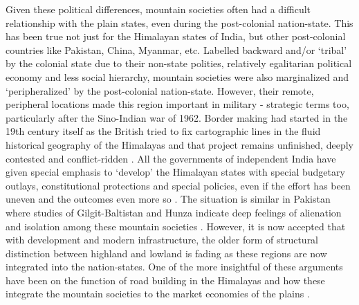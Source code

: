 Given these political differences, mountain societies often had a difficult relationship with the plain states, even during the post\hyp{}colonial nation\hyp{}state. This has been true not just for the Himalayan states of India, but other post\hyp{}colonial countries like Pakistan, China, Myanmar, etc. Labelled backward and/or `tribal' by the colonial state due to their non\hyp{}state polities, relatively egalitarian political economy and less social hierarchy, mountain societies were also marginalized and `peripheralized' by the post\hyp{}colonial nation\hyp{}state. However, their remote, peripheral locations made this region important in military \hyp{} strategic terms too, particularly after the Sino\hyp{}Indian war of 1962. Border making had started in the 19th century itself as the British tried to fix cartographic lines in the fluid historical geography of the Himalayas and that project remains unfinished, deeply contested and conflict\hyp{}ridden \citep{noorani2010india,guyot2017shadow,acharya2022boundaries}. All the governments of independent India have given special emphasis to `develop' the Himalayan states with special budgetary outlays, constitutional protections and special policies, even if the effort has been uneven and the outcomes even more so \citep{gupta2013allegiance,mathur2013naturalising,mishra2013developing}. The situation is similar in Pakistan where studies of Gilgit-Baltistan and Hunza indicate deep feelings of alienation and isolation among these mountain societies \citep{hussain2015remoteness,ali2019delusional}.  However, it is now accepted that with development and modern infrastructure, the older form of structural distinction between highland and lowland is fading as these regions are now integrated into the nation-states. One of the more insightful of these arguments have been on the function of road building in the Himalayas and how these integrate the mountain societies to the market economies of the plains \citep{murton2013himalayan}. 



